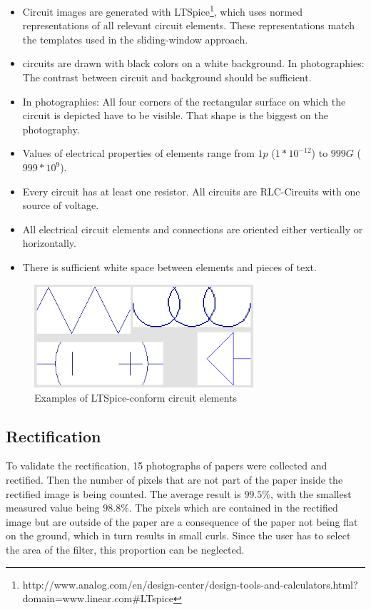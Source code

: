 \documentclass[10pt,twocolumn,letterpaper]{article}
\begin{document}
\begin{itemize}
	\item Circuit images are generated with LTSpice\footnote[1]{http://www.analog.com/en/design-center/design-tools-and-calculators.html?domain=www.linear.com\#LTspice}, which uses normed representations of all relevant circuit elements. These representations match the templates used in the sliding-window approach.
	\item circuits are drawn with black colors on a white background. In photographies: The contrast between circuit and background should be sufficient.
	\item In photographies: All four corners of the rectangular surface on which the circuit is depicted have to be visible. That shape is the biggest on the photography.
	\item Values of electrical properties of elements range from $1p$ ($1 * 10^{-12}$) to $999G$ ($999* 10^{9}$).
	\item Every circuit has at least one resistor. All circuits are RLC-Circuits with one source of voltage.
	\item All electrical circuit elements and connections are oriented either vertically or horizontally.
	\item There is sufficient white space between elements and pieces of text.
\end{itemize}
\par

\begin{figure}[!ht]
\includegraphics[width = 3.2in]{img/elements.png}
\caption{Examples of LTSpice-conform circuit elements}
\label{fig:c4}
\end{figure}

\subsection{Rectification}

To validate the rectification, 15 photographs of papers were collected and rectified. Then the number of pixels that are not part of the paper inside the rectified image is being counted. The average result is $99.5\%$, with the smallest measured value being $98.8\%$. The pixels which are contained in the rectified image but are outside of the paper are a consequence of the paper not being flat on the ground, which in turn results in small curls. Since the user has to select the area of the filter, this proportion can be neglected.
\end{document}

